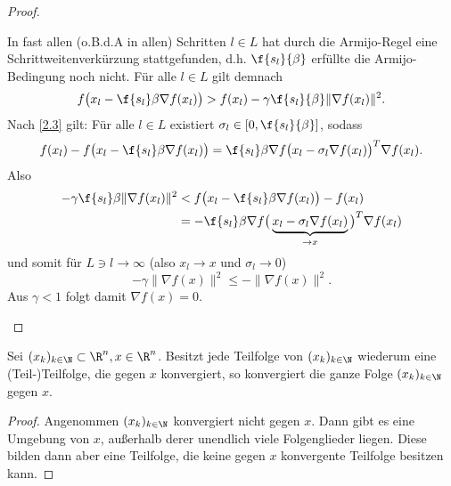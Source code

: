 \begin{st}
\begin{proof}
\begin{enumerate}[a)]
				In fast allen (o.B.d.A in allen) Schritten $l \in L$ hat durch die Armijo-Regel eine Schrittweitenverkürzung stattgefunden, d.h. $\f {s_l}{\beta}$ erfüllte die Armijo-Bedingung noch nicht.
				Für alle $l \in L$ gilt demnach
				\[
					f\big(x_l - \f {s_l}\beta \nabla f(x_l)\big)
					> f(x_l) - \gamma \f {s_l}{\beta} \| \nabla f(x_l) \|^2.
				\]
				Nach \ref{2.3} gilt:
				Für alle $l \in L$ existiert $\sigma_l \in [0, \f {s_l}{\beta}]$, sodass
				\[
					f(x_l) - f\big(x_l - \f {s_l}\beta \nabla f(x_l)\big)
					= \f {s_l}\beta \nabla f\big(x_l - \sigma_l \nabla f(x_l)\big)^T \nabla f(x_l).
				\]
				Also
				\begin{align*}
					-\gamma \f {s_l}\beta \|\nabla f(x_l)\|^2
					&< f\big(x_l - \f{s_l}\beta \nabla f(x_l)\big) - f(x_l) \\
					&= -\f {s_l}\beta \nabla f\big(\underbrace{x_l - \sigma_l \nabla f(x_l)}_{\to x}\big)^T \nabla f(x_l)
				\end{align*}
				und somit für $L \ni l \to \infty$ (also $x_l \to x$ und $\sigma_l \to 0$)
				\[
					- \gamma \|\nabla f(x)\|^2 \le - \| \nabla f(x)\|^2.
				\]
				Aus $\gamma < 1$ folgt damit $\nabla f(x) = 0$.
		\end{enumerate}
	\end{proof}
\end{st}

\begin{lem} \label{2.25}
	Sei $(x_k)_{k\in\N} \subset \R^n, x \in \R^n$.
	Besitzt jede Teilfolge von $(x_k)_{k\in\N}$ wiederum eine (Teil-)Teilfolge, die gegen $x$ konvergiert, so konvergiert die ganze Folge $(x_k)_{k\in\N}$ gegen $x$.
	\begin{proof}
		Angenommen $(x_k)_{k\in\N}$ konvergiert nicht gegen $x$.
		Dann gibt es eine Umgebung von $x$, außerhalb derer unendlich viele Folgenglieder liegen.
		Diese bilden dann aber eine Teilfolge, die keine gegen $x$ konvergente Teilfolge besitzen kann.
	\end{proof}
\end{lem}

